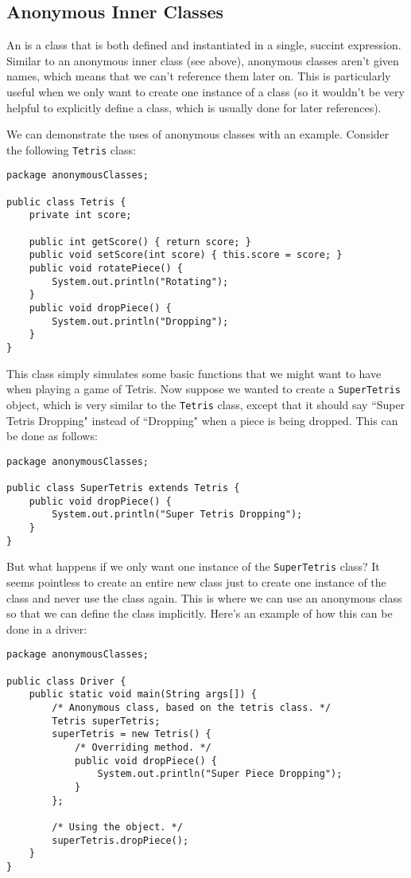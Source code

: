 \subsection{Anonymous Inner Classes}
An  is a class that is both defined and instantiated in a single, succint expression. Similar to an anonymous inner class (see above), anonymous classes aren't given names, which means that we can't reference them later on. This is particularly useful when we only want to create one instance of a class (so it wouldn't be very helpful to explicitly define a class, which is usually done for later references). 

We can demonstrate the uses of anonymous classes with an example. Consider the following \verb!Tetris! class:

\begin{lstlisting}
package anonymousClasses;

public class Tetris {
	private int score;
	
	public int getScore() { return score; }
	public void setScore(int score) { this.score = score; }
	public void rotatePiece() {
		System.out.println("Rotating");
	}
	public void dropPiece() {
		System.out.println("Dropping");
	}
}
\end{lstlisting}

This class simply simulates some basic functions that we might want to have when playing a game of Tetris. Now suppose we wanted to create a \verb!SuperTetris! object, which is very similar to the \verb!Tetris! class, except that it should say ``Super Tetris Dropping" instead of ``Dropping" when a piece is being dropped. This can be done as follows:

\begin{lstlisting}
package anonymousClasses;

public class SuperTetris extends Tetris {
	public void dropPiece() {
		System.out.println("Super Tetris Dropping");
	}
}
\end{lstlisting}

But what happens if we only want one instance of the \verb!SuperTetris! class? It seems pointless to create an entire new class just to create one instance of the class and never use the class again. This is where we can use an anonymous class so that we can define the class implicitly. Here's an example of how this can be done in a driver:

\begin{lstlisting}
package anonymousClasses;

public class Driver {
    public static void main(String args[]) { 
        /* Anonymous class, based on the tetris class. */
        Tetris superTetris;
        superTetris = new Tetris() {
            /* Overriding method. */
            public void dropPiece() {
                System.out.println("Super Piece Dropping");
            }
        };
        
        /* Using the object. */
        superTetris.dropPiece();
    }
}
\end{lstlisting}

